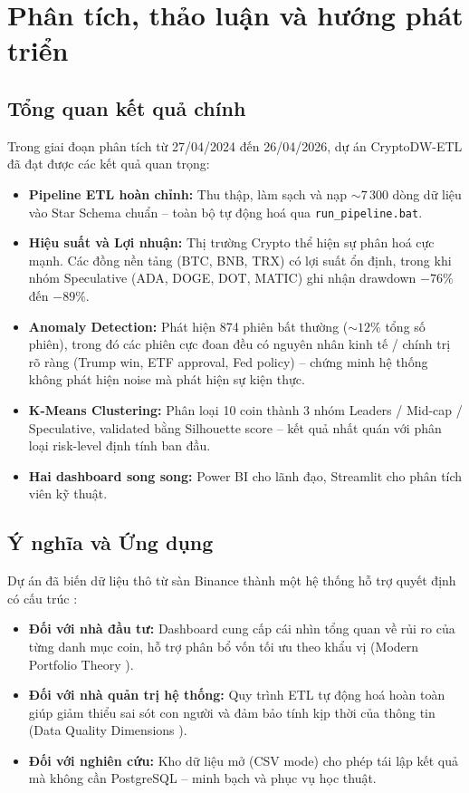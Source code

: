 \section{Phân tích, thảo luận và hướng phát triển}
\subsection{Tổng quan kết quả chính}
Trong giai đoạn phân tích từ 27/04/2024 đến 26/04/2026, dự án CryptoDW-ETL đã đạt được các kết quả quan trọng:
\begin{itemize}
    \item \textbf{Pipeline ETL hoàn chỉnh:} Thu thập, làm sạch và nạp $\sim 7\,300$ dòng dữ liệu vào Star Schema chuẩn -- toàn bộ tự động hoá qua \texttt{run\_pipeline.bat}.
    \item \textbf{Hiệu suất và Lợi nhuận:} Thị trường Crypto thể hiện sự phân hoá cực mạnh. Các đồng nền tảng (BTC, BNB, TRX) có lợi suất ổn định, trong khi nhóm Speculative (ADA, DOGE, DOT, MATIC) ghi nhận drawdown $-76\%$ đến $-89\%$.
    \item \textbf{Anomaly Detection:} Phát hiện 874 phiên bất thường ($\sim 12\%$ tổng số phiên), trong đó các phiên cực đoan đều có nguyên nhân kinh tế / chính trị rõ ràng (Trump win, ETF approval, Fed policy) -- chứng minh hệ thống không phát hiện noise mà phát hiện sự kiện thực.
    \item \textbf{K-Means Clustering:} Phân loại 10 coin thành 3 nhóm Leaders / Mid-cap / Speculative, validated bằng Silhouette score -- kết quả nhất quán với phân loại risk-level định tính ban đầu.
    \item \textbf{Hai dashboard song song:} Power BI cho lãnh đạo, Streamlit cho phân tích viên kỹ thuật.
\end{itemize}

\subsection{Ý nghĩa và Ứng dụng}
Dự án đã biến dữ liệu thô từ sàn Binance thành một hệ thống hỗ trợ quyết định có cấu trúc \cite{kimball2013}:
\begin{itemize}
    \item \textbf{Đối với nhà đầu tư:} Dashboard cung cấp cái nhìn tổng quan về rủi ro của từng danh mục coin, hỗ trợ phân bổ vốn tối ưu theo khẩu vị (Modern Portfolio Theory \cite{bodie2014}).
    \item \textbf{Đối với nhà quản trị hệ thống:} Quy trình ETL tự động hoá hoàn toàn giúp giảm thiểu sai sót con người và đảm bảo tính kịp thời của thông tin (Data Quality Dimensions \cite{inmon2005}).
    \item \textbf{Đối với nghiên cứu:} Kho dữ liệu mở (CSV mode) cho phép tái lập kết quả mà không cần PostgreSQL -- minh bạch và phục vụ học thuật.
\end{itemize}

